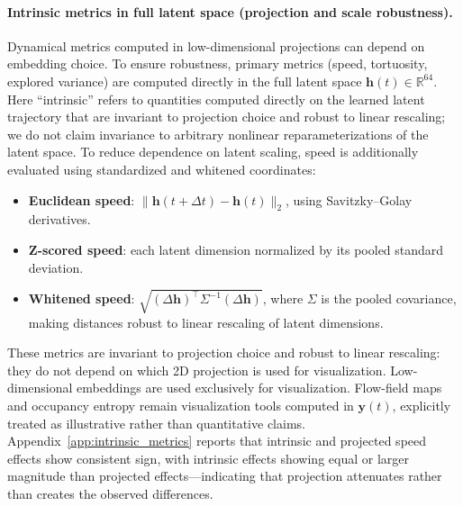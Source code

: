 \documentclass[5p,twocolumn,authoryear]{elsarticle}
\begin{document}
\paragraph{Intrinsic metrics in full latent space (projection and scale robustness).}
Dynamical metrics computed in low-dimensional projections can depend on embedding choice. To ensure robustness, primary metrics (speed, tortuosity, explored variance) are computed directly in the full latent space $\mathbf{h}(t) \in \mathbb{R}^{64}$. Here ``intrinsic'' refers to quantities computed directly on the learned latent trajectory that are invariant to projection choice and robust to linear rescaling; we do not claim invariance to arbitrary nonlinear reparameterizations of the latent space. To reduce dependence on latent scaling, speed is additionally evaluated using standardized and whitened coordinates:
\begin{itemize}
    \item \textbf{Euclidean speed}: $\|\mathbf{h}(t+\Delta t) - \mathbf{h}(t)\|_2$, using Savitzky--Golay derivatives.
    \item \textbf{Z-scored speed}: each latent dimension normalized by its pooled standard deviation.
    \item \textbf{Whitened speed}: $\sqrt{(\Delta\mathbf{h})^\top \Sigma^{-1} (\Delta\mathbf{h})}$, where $\Sigma$ is the pooled covariance, making distances robust to linear rescaling of latent dimensions.
\end{itemize}
These metrics are invariant to projection choice and robust to linear rescaling: they do not depend on which 2D projection is used for visualization. Low-dimensional embeddings are used exclusively for visualization. Flow-field maps and occupancy entropy remain visualization tools computed in $\mathbf{y}(t)$, explicitly treated as illustrative rather than quantitative claims. Appendix~\ref{app:intrinsic_metrics} reports that intrinsic and projected speed effects show consistent sign, with intrinsic effects showing equal or larger magnitude than projected effects---indicating that projection attenuates rather than creates the observed differences.
\end{document}
